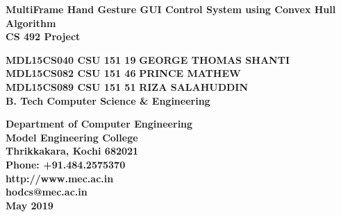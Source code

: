 \documentclass[11pt]{report}
\begin{document}
\renewcommand\bibname{References}
\pagestyle{fancy}
\fancyfoot{}
\fancyfoot[c]{\thepage}
\renewcommand{\chaptermark}[1]{
\markboth{\thechapter.\ #1}{}} 
\renewcommand{\headrulewidth}{0.1pt}
\fancyhead[r]{\slshape \leftmark}
\addtolength{\headheight}{\baselineskip}
\addtolength{\headsep}{.1in}
\lhead{\nouppercase{\rightmark}}
\rhead{\nouppercase{\leftmark}}

\begin{titlepage}
\begin{center}

\Huge{\textbf{MultiFrame Hand Gesture GUI Control System using Convex Hull Algorithm}}\\
\vspace{0.05in}
\large{\textbf{CS 492 Project\\}}
\vspace{1.2in}

\Large{\textbf{MDL15CS040 CSU 151 19}}	\hspace{.1in}	\Large{\textbf{GEORGE THOMAS SHANTI}}\\ 
\Large{\textbf{MDL15CS082 CSU 151 46}}	\hspace{.1in}	\Large{\textbf{PRINCE MATHEW}}\\ 
\Large{\textbf{MDL15CS089 CSU 151 51}}	\hspace{.1in}	\Large{\textbf{RIZA SALAHUDDIN}}\\ 
\Large{\textbf{B. Tech Computer Science \& Engineering}}


\vspace{1in}
\begin{figure}[h]
\begin{center}
\end{center}
\end{figure}
\textbf{
Department of Computer Engineering\\
Model Engineering College\\
Thrikkakara, Kochi 682021\\
Phone: +91.484.2575370\\
http://www.mec.ac.in \\
hodcs@mec.ac.in\\
\vspace{0.2in}
{\upshape May 2019}
}
\end{center}
\end{titlepage}
\end{document}
